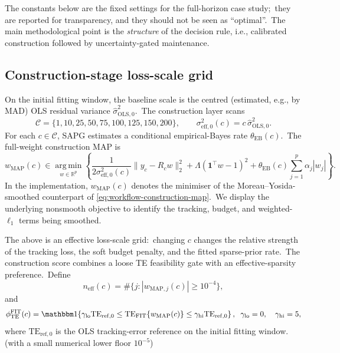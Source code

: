 \documentclass[11pt]{article}
\newcommand{\argmin}{\operatorname*{arg\,min}}
\newcommand{\one}{\mathbf{1}}
\newcommand{\TE}{\ensuremath{\mathrm{TE}}}
\begin{document}
The constants below are the fixed settings for the full-horizon case study;\ they are reported for transparency, and they should not be seen as ``optimal''.\ The main methodological point is the \emph{structure} of the decision rule, i.e., calibrated construction followed by uncertainty-gated maintenance.

\subsection{Construction-stage loss-scale grid}\label{subsec:workflow-construction-grid}

On the initial fitting window, the baseline scale is the centred (estimated, e.g., by MAD) OLS residual variance \(\widehat\sigma^2_{\mathrm{OLS},0}\).\ The construction layer scans
\begin{equation}
  \mathcal C
  =\{1,10,25,50,75,100,125,150,200\},
  \qquad
  \sigma^2_{\mathrm{eff},0}(c)=c\,\widehat\sigma^2_{\mathrm{OLS},0}.
  \label{eq:workflow-construction-c-grid}
\end{equation}
For each \(c\in\mathcal C\), SAPG estimates a conditional empirical-Bayes rate \(\theta_{\mathrm{EB}}(c)\).\ The full-weight construction MAP is
\begin{equation}
  w_{\mathrm{MAP}}(c)
  \in
  \argmin_{w\in\mathbb R^p}
  \left\{
  \frac{1}{2\sigma^2_{\mathrm{eff},0}(c)}\|y_c-R_cw\|_2^2
  +\Lambda(\one^\top w-1)^2
  +\theta_{\mathrm{EB}}(c)\sum_{j=1}^p\alpha_j|w_j|
  \right\}.
  \label{eq:workflow-construction-map}
\end{equation}
In the implementation, \(w_{\mathrm{MAP}}(c)\) denotes the minimiser of the Moreau--Yosida-smoothed counterpart of \eqref{eq:workflow-construction-map}.\ We display the underlying nonsmooth objective to identify the tracking, budget, and weighted-\(\ell_1\) terms being smoothed.

The above is an effective loss-scale grid:\ changing \(c\) changes the relative strength of the tracking loss, the soft budget penalty, and the fitted sparse-prior rate.\
The construction score combines a loose TE feasibility gate with an effective-sparsity preference.\ Define
\begin{equation}
  n_{\mathrm{eff}}(c)
  =\#\{j:|w_{\mathrm{MAP},j}(c)|\geq 10^{-4}\},
  \label{eq:workflow-construction-neff}
\end{equation}
and
\begin{equation}
  \phi^{\mathrm{FIT}}_{\mathrm{TE}}(c)
  =
  \mathbbm 1\!\left\{
    \gamma_{\mathrm{lo}}\TE_{\mathrm{ref},0}
    \leq
    \TE_{\mathrm{FIT}}\{w_{\mathrm{MAP}}(c)\}
    \leq
    \gamma_{\mathrm{hi}}\TE_{\mathrm{ref},0}
  \right\},
  \;\;
  \gamma_{\mathrm{lo}}=0,\quad \gamma_{\mathrm{hi}}=5,
  \label{eq:workflow-construction-te-gate}
\end{equation}
where \(\mathrm{TE}_{\mathrm{ref},0}\) is the OLS tracking-error reference on the initial fitting window. (with a small numerical lower floor \(10^{-5}\)) 
\end{document}

